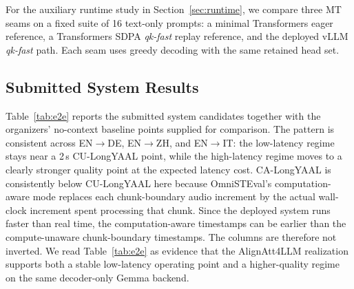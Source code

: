 \documentclass[11pt]{article}
\def\AAName{AlignAtt4LLM}
\begin{document}
For the auxiliary runtime study in Section~\ref{sec:runtime}, we compare three
MT seams on a fixed suite of 16 text-only prompts: a minimal Transformers eager
reference, a Transformers SDPA \emph{qk-fast} replay reference, and the
deployed vLLM \emph{qk-fast} path. Each seam uses greedy decoding with the
same retained head set.

\subsection{Submitted System Results}
\label{sec:main-results}

Table~\ref{tab:e2e} reports the submitted system candidates together with the
organizers' no-context baseline points supplied for comparison. The pattern is
consistent across EN$\to$DE, EN$\to$ZH, and EN$\to$IT: the low-latency regime
stays near a 2\,s CU-LongYAAL point, while the high-latency regime moves to a
clearly stronger quality point at the expected latency cost. CA-LongYAAL is
consistently below CU-LongYAAL here because OmniSTEval's computation-aware mode
replaces each chunk-boundary audio increment by the actual wall-clock increment
spent processing that chunk. Since the deployed system runs faster than real
time, the computation-aware timestamps can be earlier than the
compute-unaware chunk-boundary timestamps. The columns are therefore not
inverted. We read Table~\ref{tab:e2e} as evidence that the \AAName{}
realization supports
both a stable low-latency operating point and a higher-quality regime on the
same decoder-only Gemma backend.
\end{document}
